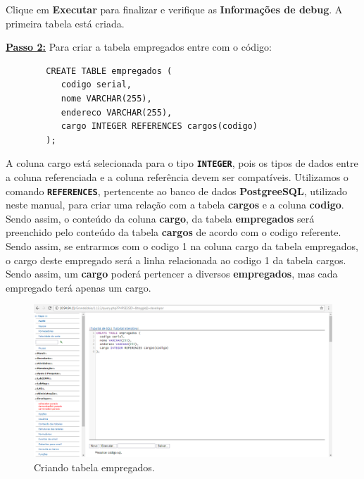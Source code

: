 \documentclass[9pt]{report}
\begin{document}
{      Clique em \textbf{Executar} para finalizar e verifique as \textbf{Informações de debug}. A primeira tabela está criada.

      \underline{\textbf{Passo 2:}} Para criar a tabela empregados
      entre com o código:

      \begin{lstlisting}
        CREATE TABLE empregados (
           codigo serial,
           nome VARCHAR(255),
           endereco VARCHAR(255),
           cargo INTEGER REFERENCES cargos(codigo)
        );
      \end{lstlisting}

      A coluna cargo está selecionada para o tipo
      \texttt{\textbf{INTEGER}}, pois os tipos de dados entre a
      coluna referenciada e a coluna referência devem ser
      compatíveis. Utilizamos o comando \texttt{\textbf{REFERENCES}},
      pertencente ao banco de dados \textbf{PostgreeSQL}, utilizado
      neste manual, para criar uma relação com a tabela
      \textbf{cargos} e a coluna \textbf{codigo}. Sendo assim, o
      conteúdo da coluna \textbf{cargo}, da tabela
      \textbf{empregados}  será preenchido pelo conteúdo da tabela
      \textbf{cargos} de acordo com o codigo referente. Sendo assim,
      se entrarmos com o codigo 1 na coluna cargo da tabela
      empregados, o cargo deste empregado será a linha relacionada
      ao codigo 1 da tabela cargos. Sendo assim, um \textbf{cargo}
      poderá pertencer a diversos \textbf{empregados}, mas cada
      empregado terá apenas um cargo.

      \begin{figure}[H]
        \includegraphics[width=\textwidth]{2_Formularios/3_Relacionamento_1_N/27.png}
        \caption{Criando tabela empregados.}
        \label{fig:criatableempregados}
      \end{figure}
      
}
\end{document}
